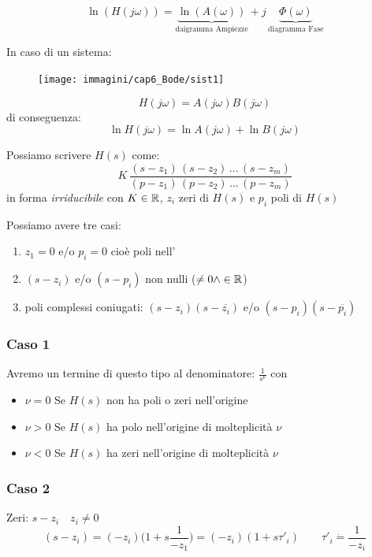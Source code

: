 \[ 
	\ln (H(j\omega)) = \underbrace{\ln (A(\omega))}_{\text{daigramma Ampiezze}} + j\,\underbrace{\Phi (\omega)}_{\text{diagramma Fase}}
 \]
 
 In caso di un sistema:
 \begin{figure}[H]
 	\centering
 	\texttt{[image: immagini/cap6\_Bode/sist1]}
 	\label{fig:sist1}
 \end{figure}

\[ 
	H(j \omega)=A(j \omega)B(j \omega)
 \]
 di conseguenza: 
 \[ 
	\ln H(j \omega)=\ln A(j \omega) + \ln B(j \omega)
 \]
 
 
 
 Possiamo scrivere $ H(s) $ come:
 \[  
 	K \, \frac{(s-z_1)\,(s-z_2)\,\dots \,(s-z_m)}{(p-z_1)\,(p-z_2)\,\dots \,(p-z_m)}
 \]
 in forma \emph{irriducibile} con $K \in \mathbb{R}  $, $ z_i $ zeri di $ H(s) $ e $ p_i $ poli di $ H(s) $
 
 Possiamo avere tre casi:
 \begin{enumerate}
 	\item $ z_1=0 $ e/o $ p_i = 0 $ cioè poli nell' \\
 	\item $ (s-z_i) $ e/o $ (s-p_i) $ non nulli ($ \ne 0  \wedge \in \mathbb{R}$)\\
 	\item poli complessi coniugati: $ (s-z_i)(s-\overline{z_i}) $ e/o  $ (s-p_i)(s-\overline{p_i}) $
 \end{enumerate}

\subsubsection{Caso 1}
Avremo un termine di questo tipo al denominatore:
 $ \frac{1}{s^\nu}  $
con 
\begin{itemize}
	\item $ \nu =0 $ Se $ H(s) $ non ha poli o zeri nell'origine\\
	\item $ \nu >0 $ Se $ H(s) $ ha polo nell'origine di molteplicità $ \nu $\\
	\item $ \nu <0 $ Se $ H(s) $ ha zeri nell'origine di molteplicità $\nu$
\end{itemize}

\subsubsection{Caso 2}
Zeri: $ s-z_i \quad z_i \ne 0 $
\[ 
	(s-z_i)=(-z_i)\Big(1+s \frac{1}{-z_1} \Big)=(-z_i)(1+s \tau'_i) \qquad \tau'_i \dot{=} \frac{1}{-z_i}
 \]
 
